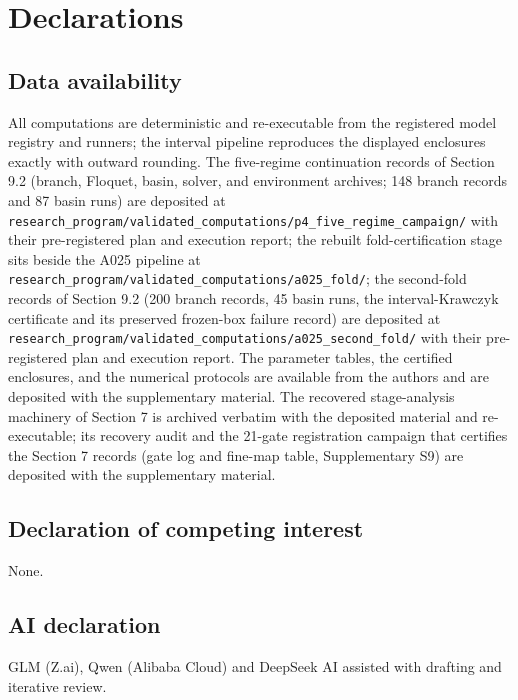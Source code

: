 \documentclass[11pt]{article}
\begin{document}
\section*{Declarations}

\subsection*{Data availability}

All computations are deterministic and re-executable from the registered
model registry and runners; the interval pipeline reproduces the
displayed enclosures exactly with outward rounding. The five-regime
continuation records of Section 9.2 (branch, Floquet, basin, solver, and
environment archives; 148 branch records and 87 basin runs) are
deposited at
\texttt{research\_program/validated\_computations/p4\_five\_regime\_campaign/}
with their pre-registered plan and execution report; the rebuilt
fold-certification stage sits beside the A025 pipeline at
\texttt{research\_program/validated\_computations/a025\_fold/}; the
second-fold records of Section 9.2 (200 branch records, 45 basin runs,
the interval-Krawczyk certificate and its preserved frozen-box failure
record) are deposited at
\texttt{research\_program/validated\_computations/a025\_second\_fold/}
with their pre-registered plan and execution report. The parameter
tables, the certified enclosures, and the numerical protocols are
available from the authors and are deposited with the supplementary
material. The recovered stage-analysis machinery of Section 7 is
archived verbatim with the deposited material and re-executable; its
recovery audit and the 21-gate registration campaign that certifies the
Section 7 records (gate log and fine-map table, Supplementary S9) are
deposited with the supplementary material.

\subsection*{Declaration of competing interest}

None.

\subsection*{AI declaration}
GLM (Z.ai), Qwen (Alibaba Cloud) and DeepSeek AI assisted with drafting and iterative review.
\end{document}
